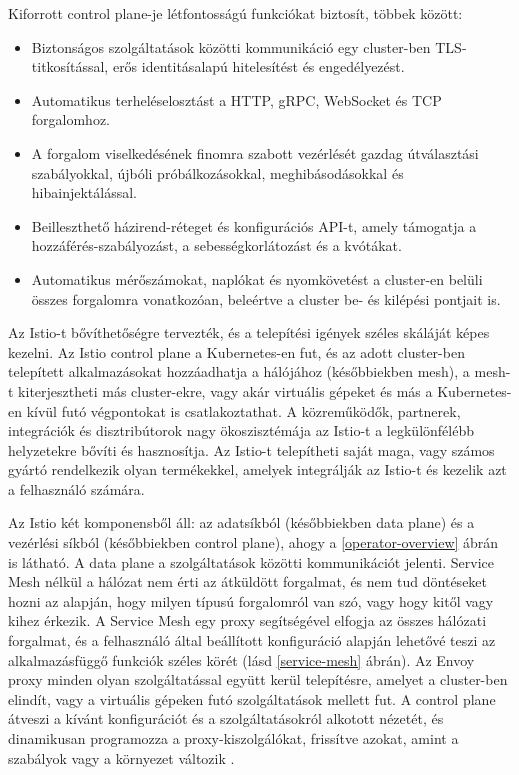 \newpage

Kiforrott control plane-je létfontosságú funkciókat biztosít, többek között:

\begin{itemize}
    \item Biztonságos szolgáltatások közötti kommunikáció egy cluster-ben TLS-titkosítással, erős identitásalapú hitelesítést és engedélyezést.
    \item Automatikus terheléselosztást a HTTP, gRPC, WebSocket és TCP forgalomhoz.
    \item A forgalom viselkedésének finomra szabott vezérlését gazdag útválasztási szabályokkal, újbóli próbálkozásokkal, meghibásodásokkal és hibainjektálással.
    \item Beilleszthető házirend-réteget és konfigurációs API-t, amely támogatja a hozzáférés-szabályozást, a sebességkorlátozást és a kvótákat.
    \item Automatikus mérőszámokat, naplókat és nyomkövetést a cluster-en belüli összes forgalomra vonatkozóan, beleértve a cluster be- és kilépési pontjait is.
\end{itemize}

Az Istio-t bővíthetőségre tervezték, és a telepítési igények széles skáláját képes kezelni.
Az Istio control plane a Kubernetes-en fut, és az adott cluster-ben telepített alkalmazásokat hozzáadhatja a hálójához (későbbiekben mesh), a mesh-t kiterjesztheti más cluster-ekre, vagy akár virtuális gépeket és más a Kubernetes-en kívül futó végpontokat is csatlakoztathat.
A közreműködők, partnerek, integrációk és disztribútorok nagy ökoszisztémája az Istio-t a legkülönfélébb helyzetekre bővíti és hasznosítja.
Az Istio-t telepítheti saját maga, vagy számos gyártó rendelkezik olyan termékekkel, amelyek integrálják az Istio-t és kezelik azt a felhasználó számára.

Az Istio két komponensből áll: az adatsíkból (későbbiekben data plane) és a vezérlési síkból (későbbiekben control plane), ahogy a \ref{operator-overview} ábrán is látható.
A data plane a szolgáltatások közötti kommunikációt jelenti.
Service Mesh nélkül a hálózat nem érti az átküldött forgalmat, és nem tud döntéseket hozni az alapján, hogy milyen típusú forgalomról van szó, vagy hogy kitől vagy kihez érkezik.
A Service Mesh egy proxy segítségével elfogja az összes hálózati forgalmat, és a felhasználó által beállított konfiguráció alapján lehetővé teszi az alkalmazásfüggő funkciók széles körét (lásd \ref{service-mesh} ábrán).
Az Envoy proxy minden olyan szolgáltatással együtt kerül telepítésre, amelyet a cluster-ben elindít, vagy a virtuális gépeken futó szolgáltatások mellett fut.
A control plane átveszi a kívánt konfigurációt és a szolgáltatásokról alkotott nézetét, és dinamikusan programozza a proxy-kiszolgálókat, frissítve azokat, amint a szabályok vagy a környezet változik \cite{istioSM}.


